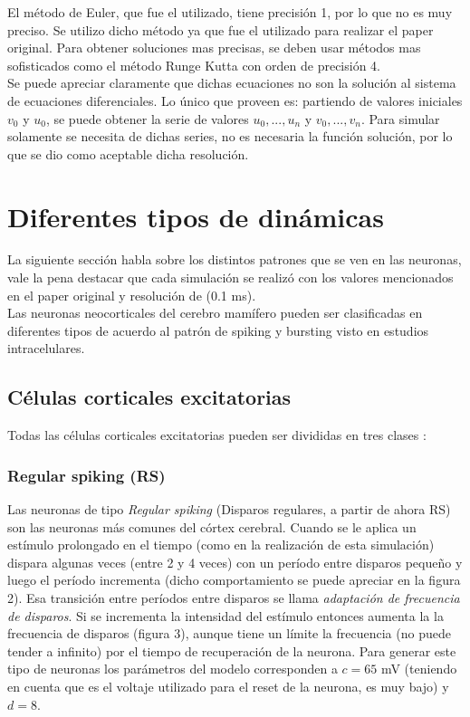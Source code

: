 \documentclass[12pt]{article}
\begin{document}
El método de Euler, que fue el utilizado, tiene precisión 1, por lo que no es muy preciso. Se utilizo dicho método ya que fue el utilizado para realizar el paper original.
Para obtener soluciones mas precisas, se deben usar métodos mas sofisticados como el método Runge Kutta con orden de precisión 4. \\

Se puede apreciar claramente que dichas ecuaciones no son la solución al sistema de ecuaciones diferenciales. Lo único que proveen es: partiendo de valores iniciales $v_0$ y $u_0$,
se puede obtener la serie de valores $u_0,...,u_n$ y $v_0,...,v_n$. Para simular solamente se necesita de dichas series, no es necesaria la función solución, por lo que se dio como aceptable dicha resolución.

\section{Diferentes tipos de dinámicas}

La siguiente sección habla sobre los distintos patrones que se ven en las neuronas, vale la pena destacar que cada simulación se realizó con los valores
mencionados en el paper original y resolución de (0.1 ms). \\

Las neuronas neocorticales del cerebro mamífero pueden ser clasificadas en diferentes tipos de acuerdo al patrón de spiking y bursting visto en estudios intracelulares. \\

\subsection{Células corticales excitatorias}
Todas las células corticales excitatorias pueden ser divididas en tres clases \cite{firingPatters} \cite{chatteringCells}:

\newpage
\subsubsection{Regular spiking (RS)}
Las neuronas de tipo \textit{Regular spiking} (Disparos regulares, a partir de ahora RS) son las neuronas más comunes del córtex cerebral. Cuando se le aplica un estímulo prolongado en el tiempo (como en la realización de esta simulación)
dispara algunas veces (entre 2 y 4 veces) con un período entre disparos pequeño y luego el período incrementa (dicho comportamiento se puede apreciar en la figura 2). Esa transición entre períodos entre disparos se llama \textit{adaptación de frecuencia de disparos}.
Si se incrementa la intensidad del estímulo entonces aumenta la la frecuencia de disparos (figura 3), aunque tiene un límite la frecuencia (no puede tender a infinito) por el tiempo de recuperación de la neurona.
Para generar este tipo de neuronas los parámetros del modelo corresponden a $c = 65$ mV (teniendo en cuenta que
es el voltaje utilizado para el reset de la neurona, es muy bajo) y $d=8$.
\end{document}
